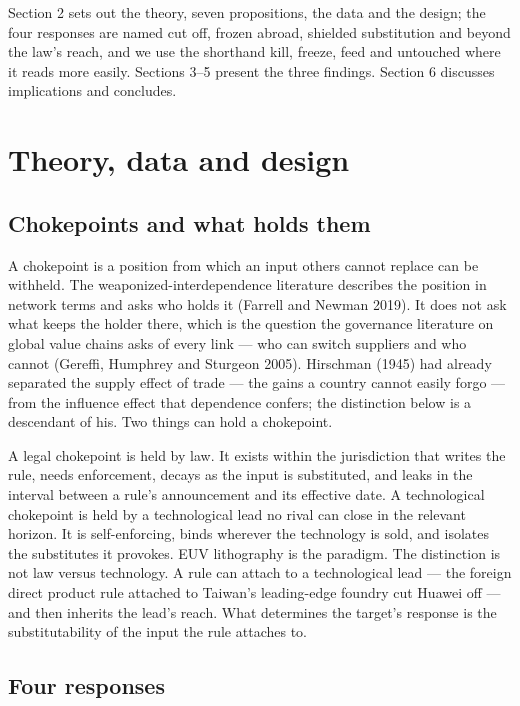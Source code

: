 \documentclass[12pt]{article}
\begin{document}
Section 2 sets out the theory, seven propositions, the data and the design; the four responses are named cut off, frozen abroad, shielded substitution and beyond the law's reach, and we use the shorthand kill, freeze, feed and untouched where it reads more easily. Sections 3--5 present the three findings. Section 6 discusses implications and concludes.

\FloatBarrier{}
\section{Theory, data and design}

\subsection{Chokepoints and what holds them}

A chokepoint is a position from which an input others cannot replace can be withheld. The weaponized-interdependence literature describes the position in network terms and asks who holds it (Farrell and Newman 2019). It does not ask what keeps the holder there, which is the question the governance literature on global value chains asks of every link --- who can switch suppliers and who cannot (Gereffi, Humphrey and Sturgeon 2005). Hirschman (1945) had already separated the supply effect of trade --- the gains a country cannot easily forgo --- from the influence effect that dependence confers; the distinction below is a descendant of his. Two things can hold a chokepoint.

A legal chokepoint is held by law. It exists within the jurisdiction that writes the rule, needs enforcement, decays as the input is substituted, and leaks in the interval between a rule's announcement and its effective date. A technological chokepoint is held by a technological lead no rival can close in the relevant horizon. It is self-enforcing, binds wherever the technology is sold, and isolates the substitutes it provokes. EUV lithography is the paradigm. The distinction is not law versus technology. A rule can attach to a technological lead --- the foreign direct product rule attached to Taiwan's leading-edge foundry cut Huawei off --- and then inherits the lead's reach. What determines the target's response is the substitutability of the input the rule attaches to.

\subsection{Four responses}
\end{document}
